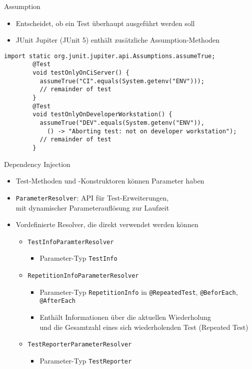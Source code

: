 \documentclass[utf8,t,aspectratio=169]{beamer}
\begin{document}
    \begin{frame}[fragile]{Assumption}
      \begin{itemize}
        \item Entscheidet, ob ein Test überhaupt ausgeführt werden soll
        \item JUnit Jupiter (JUnit 5) enthält zusätzliche Assumption-Methoden
      \end{itemize}
      \begin{lstlisting}[gobble=8]
        import static org.junit.jupiter.api.Assumptions.assumeTrue;
        @Test
        void testOnlyOnCiServer() {
          assumeTrue("CI".equals(System.getenv("ENV")));
          // remainder of test
        }
        @Test
        void testOnlyOnDeveloperWorkstation() {
          assumeTrue("DEV".equals(System.getenv("ENV")),
            () -> "Aborting test: not on developer workstation");
          // remainder of test
        }
      \end{lstlisting}
    \end{frame}
    \begin{frame}{Dependency Injection}
      \begin{itemize}
        \item Test-Methoden und -Konstruktoren können Parameter haben
        \item \lstinline|ParameterResolver|: API für Test-Erweiterungen,\\
          mit dynamischer Parameterauflösung zur Laufzeit
        \item Vordefinierte Resolver, die direkt verwendet werden können
          \begin{itemize}
            \item \lstinline|TestInfoParamterResolver|
                \begin{itemize}
                  \item Parameter-Typ \lstinline|TestInfo|
                \end{itemize}
              \item \lstinline|RepetitionInfoParameterResolver|
                \begin{itemize}
                  \item Parameter-Typ \lstinline|RepetitionInfo| in
                    \lstinline|@RepeatedTest|, \lstinline|@BeforEach|,
                    \lstinline|@AfterEach|
                  \item Enthält Informationen über die aktuellen Wiederholung\\
                    und die Gesamtzahl eines sich wiederholenden Test (Repeated
                    Test)
                \end{itemize}
              \item \lstinline|TestReporterParameterResolver|
                \begin{itemize}
                  \item Parameter-Typ \lstinline|TestReporter|
                \end{itemize}
          \end{itemize}
      \end{itemize}
    \end{frame}
\end{document}
